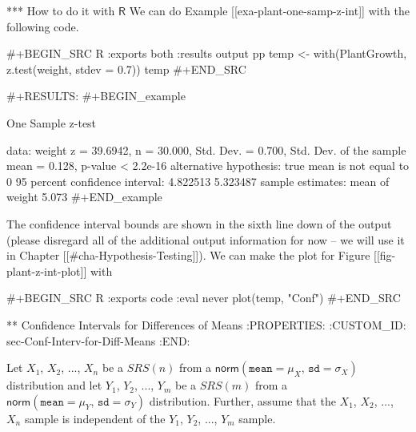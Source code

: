 *** How to do it with \(\mathsf{R}\)
We can do Example [[exa-plant-one-samp-z-int]] with the following code.

#+BEGIN_SRC R :exports both :results output pp 
temp <- with(PlantGrowth, z.test(weight, stdev = 0.7))
temp
#+END_SRC

#+RESULTS:
#+BEGIN_example

	One Sample z-test

data:  weight
z = 39.6942, n = 30.000, Std. Dev. = 0.700, Std. Dev. of the sample mean = 0.128,
p-value < 2.2e-16
alternative hypothesis: true mean is not equal to 0
95 percent confidence interval:
 4.822513 5.323487
sample estimates:
mean of weight 
         5.073
#+END_example

The confidence interval bounds are shown in the sixth line down of the
output (please disregard all of the additional output information for
now -- we will use it in Chapter [[#cha-Hypothesis-Testing]]). We can make the
plot for Figure [[fig-plant-z-int-plot]] with

#+BEGIN_SRC R :exports code :eval never
plot(temp, "Conf")
#+END_SRC

** Confidence Intervals for Differences of Means
:PROPERTIES:
:CUSTOM_ID: sec-Conf-Interv-for-Diff-Means
:END:

Let \(X_{1}\), \(X_{2}\), ..., \(X_{n}\) be a \(SRS(n)\) from a
\(\mathsf{norm}(\mathtt{mean}=\mu_{X},\,\mathtt{sd}=\sigma_{X})\)
distribution and let \(Y_{1}\), \(Y_{2}\), ..., \(Y_{m}\) be a
\(SRS(m)\) from a
\(\mathsf{norm}(\mathtt{mean}=\mu_{Y},\,\mathtt{sd}=\sigma_{Y})\)
distribution. Further, assume that the \(X_{1}\), \(X_{2}\), ...,
\(X_{n}\) sample is independent of the \(Y_{1}\), \(Y_{2}\), ...,
\(Y_{m}\) sample.

